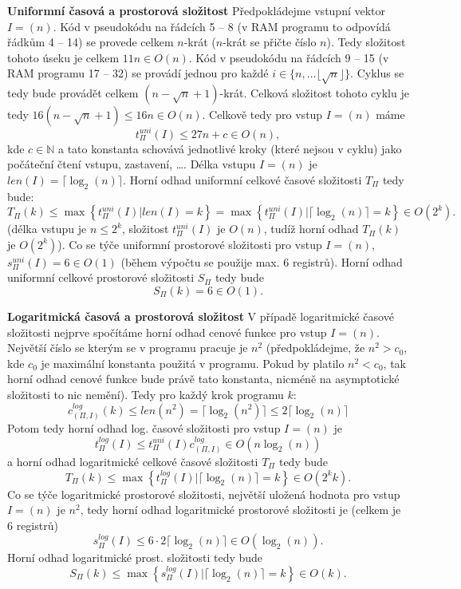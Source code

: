 \documentclass[a4paper,12pt]{article}
\begin{document}
\begin{enumerate}[label=\textbf{\arabic*}.]
  {\bfseries Uniformní časová a prostorová složitost}
  Předpokládejme vstupní vektor $I = (n)$. Kód v pseudokódu na řádcích 5 -- 8 (v RAM programu to odpovídá řádkům 4 -- 14) se provede 
  celkem $n$-krát ($n$-krát se přičte číslo $n$). Tedy složitost tohoto úseku je celkem $11n \in O(n)$. Kód v pseudokódu na
  řádcích 9 -- 15 (v RAM programu 17 -- 32) se provádí jednou pro každé $i \in \{n, \dots \lfloor\sqrt{n}\rfloor\}$. Cyklus
  se tedy bude provádět celkem $(n - \sqrt{n} + 1)$-krát. Celková složitost tohoto cyklu je tedy $16(n - \sqrt{n} + 1) \leq 16n\in O(n)$.
  Celkově tedy pro vstup $I = (n)$ máme 
  $$
   t^{uni}_{\Pi}(I) \leq 27n + c \in O(n),
  $$
  kde $c\in \mathbb{N}$ a tato konstanta schovává jednotlivé kroky (které nejsou v cyklu) jako počáteční čtení vstupu, zastavení, \dots.
  Délka vstupu $I = (n)$ je $len(I) = \lceil\log_2(n)\rceil$. Horní odhad uniformní celkové časové složitosti $T_\Pi$ tedy bude:
  $$
    T_\Pi (k) \leq \max\left\{t_\Pi^{uni}(I) | len(I) = k\right\} = \max\left\{t_\Pi^{uni}(I) | \lceil\log_2(n)\rceil = k\right\} \in O(2^k).
  $$
  (délka vstupu je $n \leq 2^k$, složitost $t^{uni}_{\Pi}(I)$ je $O(n)$, tudíž horní odhad $T_\Pi (k)$ je $O(2^k)$).
  Co se týče uniformní prostorové složitosti pro vstup $I = (n)$, $s^{uni}_{\Pi}(I) = 6 \in O(1)$ (během výpočtu se použije max. 6 registrů).
  Horní odhad uniformní celkové prostorové složitosti $S_\Pi$ tedy bude
  $$
    S_\Pi (k) = 6 \in O(1).
  $$
   
  {\bfseries Logaritmická časová a prostorová složitost}
  V případě logaritmické časové složitosti nejprve spočítáme horní odhad cenové funkce pro vstup $I = (n)$. Největší
  číslo se kterým se v programu pracuje je $n^2$ (předpokládejme, že $n^2 > c_0$, kde $c_0$ je maximální konstanta použitá v programu. Pokud 
  by platilo $n^2 < c_0$, tak horní odhad cenové funkce bude právě tato konstanta, nicméně na asymptotické složitosti to nic nemění). Tedy 
  pro každý krok programu $k$:
  $$
    c^{log}_{(\Pi,I)}(k) \leq len(n^2) = \lceil\log_2(n^2)\rceil \leq 2\lceil\log_2(n)\rceil
  $$
  Potom tedy horní odhad log. časové složitosti pro vstup $I = (n)$ je 
  $$
    t^{log}_{\Pi}(I) \leq t^{uni}_\Pi (I)c^{log}_{(\Pi,I)} \in O(n\log_2(n))
  $$
  a horní odhad logaritmické celkové časové složitosti $T_\Pi$ tedy bude
  $$
    T_\Pi (k) \leq \max\left\{t_\Pi^{log}(I) | \lceil\log_2(n)\rceil = k\right\} \in O(2^kk).
  $$
  Co se týče logaritmické prostorové složitosti, největší uložená hodnota pro vstup $I = (n)$ je $n^2$, tedy horní odhad
  logaritmické prostorové složitosti je (celkem je 6 registrů)
  $$
    s^{log}_{\Pi}(I) \leq 6\cdot2\lceil\log_2(n)\rceil \in O(\log_2(n)).
  $$
  Horní odhad logaritmické prost. složitosti tedy bude
  $$
    S_\Pi (k) \leq \max\left\{s_\Pi^{log}(I) | \lceil\log_2(n)\rceil = k\right\} \in O(k).
  $$


\end{enumerate}
\end{document}

